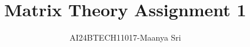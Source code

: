 \documentclass[journal]{IEEEtran}
\begin{document}

\vspace{3cm}

\title{Matrix Theory Assignment 1}
\author{AI24BTECH11017-Maanya Sri
}
{\let\newpage\relax\maketitle}

\renewcommand{\thefigure}{\theenumi}
\renewcommand{\thetable}{\theenumi}
\setlength{\intextsep}{10pt} %


\renewcommand{\thetable}{\theenumi}
\end{document}
